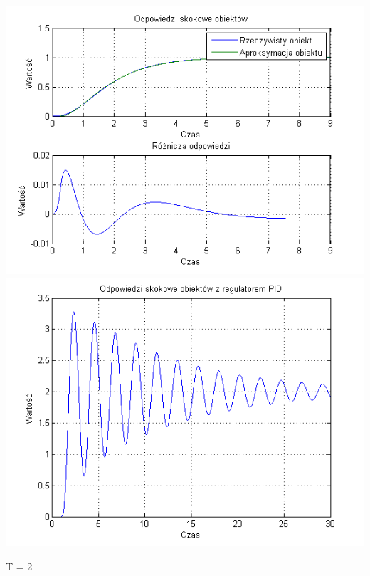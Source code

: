 \documentclass[10pt,a4paper]{article}
\begin{document}
\begin{center}
\includegraphics[scale=1]{images/dwa/skrypt_97.png}\\
\includegraphics[scale=1]{images/dwa/skrypt_98.png}\\
\end{center}
\newpage
T = 2
\end{document}
